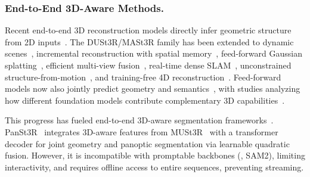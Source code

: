 \vspace{-1em}
\subsubsection{End-to-End 3D-Aware Methods.}
Recent end-to-end 3D reconstruction models directly infer geometric structure from 2D inputs~\cite{cabon2025must3r, wang2024dust3r, wang2025continuous, wang2025vggt, yang2025fast3r, chen2025long3r, leroy2024grounding, wu2025point3r, charatan2024pixelsplat, ye2024no, wang20243d, lin2025longsplat, shih2025prior, fan2025spectromotion, liu2023robust, su2024boostmvsnerfs}. The DUSt3R/MASt3R family has been extended to dynamic scenes~\cite{zhang2024monst3r}, incremental reconstruction with spatial memory~\cite{wang20253d}, feed-forward Gaussian splatting~\cite{smart2024splatt3r}, efficient multi-view fusion~\cite{tang2025mv}, real-time dense SLAM~\cite{murai2025mast3r}, unconstrained structure-from-motion~\cite{duisterhof2025mast3r}, and training-free 4D reconstruction~\cite{chen2025easi3r}. Feed-forward models now also jointly predict geometry and semantics~\cite{fan2024large, sun2025uni3r, jiang2025gausstr}, with studies analyzing how different foundation models contribute complementary 3D capabilities~\cite{man2024lexicon3d}.

This progress has fueled end-to-end 3D-aware segmentation frameworks~\cite{jain2024odin, Jayanti2025SegMASt3R, li2025ovseg3r}. PanSt3R~\cite{zust2025panst3r} integrates 3D-aware features from MUSt3R~\cite{cabon2025must3r} with a transformer decoder for joint geometry and panoptic segmentation via learnable quadratic fusion. However, it is incompatible with promptable backbones (\eg, SAM2), limiting interactivity, and requires offline access to entire sequences, preventing streaming. 




